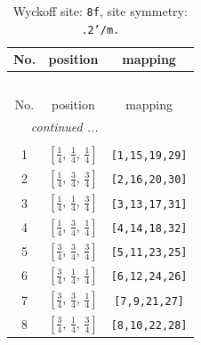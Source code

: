 \documentclass[fleqn,8pt]{jsarticle}
\begin{document}
\begin{longtable}{ccc}
\caption{Wyckoff site: {\tt 8f}, site symmetry: {\tt .2'/m.}}
 \\
 \hline \hline
No. & position & mapping \\ \hline \endfirsthead

\multicolumn{2}{l}{\tablename\ \thetable{}} \\
 \hline \hline
No. & position & mapping \\ \hline \endhead

 \hline \hline
\multicolumn{2}{r}{\footnotesize\it continued ...} \\ \endfoot

 \hline \hline
\multicolumn{2}{r}{} \\ \endlastfoot

1 & $\left[ \frac{1}{4},\, \frac{1}{4},\, \frac{1}{4} \right]$ & {\tt [1,15,19,29]} \\ \hline
2 & $\left[ \frac{1}{4},\, \frac{3}{4},\, \frac{3}{4} \right]$ & {\tt [2,16,20,30]} \\ \hline
3 & $\left[ \frac{1}{4},\, \frac{1}{4},\, \frac{3}{4} \right]$ & {\tt [3,13,17,31]} \\ \hline
4 & $\left[ \frac{1}{4},\, \frac{3}{4},\, \frac{1}{4} \right]$ & {\tt [4,14,18,32]} \\ \hline
5 & $\left[ \frac{3}{4},\, \frac{3}{4},\, \frac{3}{4} \right]$ & {\tt [5,11,23,25]} \\ \hline
6 & $\left[ \frac{3}{4},\, \frac{1}{4},\, \frac{1}{4} \right]$ & {\tt [6,12,24,26]} \\ \hline
7 & $\left[ \frac{3}{4},\, \frac{3}{4},\, \frac{1}{4} \right]$ & {\tt [7,9,21,27]} \\ \hline
8 & $\left[ \frac{3}{4},\, \frac{1}{4},\, \frac{3}{4} \right]$ & {\tt [8,10,22,28]} \\
\end{longtable}
\renewcommand{\arraystretch}{1.2}
\end{document}
